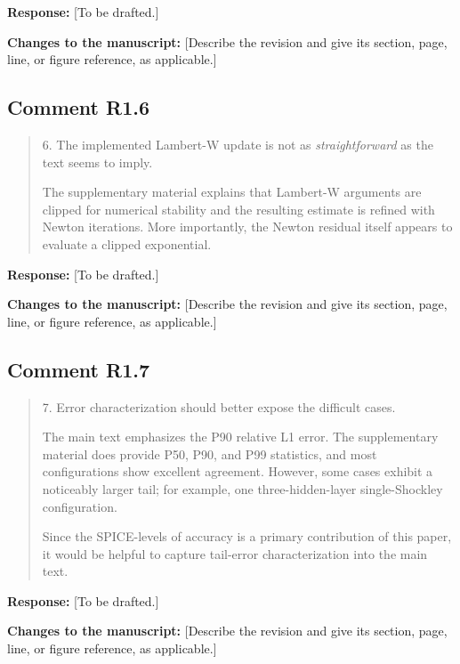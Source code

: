 \documentclass[11pt,a4paper]{article}
\newenvironment{reviewercomment}
  {\begin{quote}\small\color{reviewerblue}}
  {\end{quote}}
\newcommand{\placeholder}[1]{[#1]}
\begin{document}
\noindent\textbf{Response:}
\placeholder{To be drafted.}

\noindent\textbf{Changes to the manuscript:}
\placeholder{Describe the revision and give its section, page, line, or figure reference, as applicable.}

\subsection*{Comment R1.6}
\begin{reviewercomment}
6. The implemented Lambert-W update is not as \emph{straightforward} as the
text seems to imply.

The supplementary material explains that Lambert-W arguments are clipped
for numerical stability and the resulting estimate is refined with Newton
iterations. More importantly, the Newton residual itself appears to
evaluate a clipped exponential.
\end{reviewercomment}

\noindent\textbf{Response:}
\placeholder{To be drafted.}

\noindent\textbf{Changes to the manuscript:}
\placeholder{Describe the revision and give its section, page, line, or figure reference, as applicable.}

\subsection*{Comment R1.7}
\begin{reviewercomment}
7. Error characterization should better expose the difficult cases.

The main text emphasizes the P90 relative L1 error. The supplementary
material does provide P50, P90, and P99 statistics, and most configurations
show excellent agreement. However, some cases exhibit a noticeably larger
tail; for example, one three-hidden-layer single-Shockley configuration.

Since the SPICE-levels of accuracy is a primary contribution of this
paper, it would be helpful to capture tail-error characterization into
the main text.
\end{reviewercomment}

\noindent\textbf{Response:}
\placeholder{To be drafted.}

\noindent\textbf{Changes to the manuscript:}
\placeholder{Describe the revision and give its section, page, line, or figure reference, as applicable.}
\end{document}
